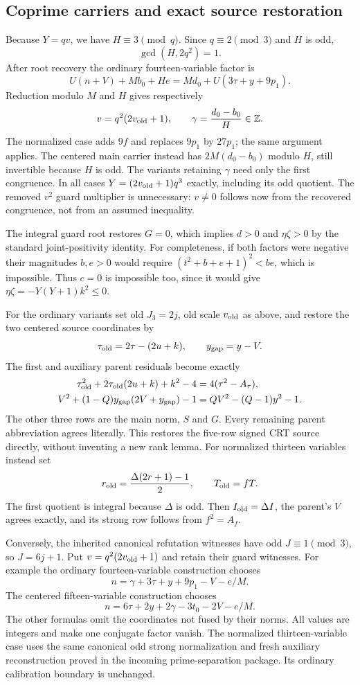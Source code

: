 \documentclass[11pt]{article}
\begin{document}
\subsection{Coprime carriers and exact source restoration}
Because $Y=qv$, we have $H\equiv3\pmod q$. Since $q\equiv2\pmod3$
and $H$ is odd,
\[
 \gcd(H,2q^2)=1.
\]
After root recovery the ordinary fourteen-variable factor is
\[
 U(n+V)+Mb_0+He=Md_0+U(3\tau+y+9p_1).
\]
Reduction modulo $M$ and $H$ gives respectively
\[
 v=q^2(2v_{\rm old}+1),\qquad
 \gamma=\frac{d_0-b_0}{H}\in\mathbb Z.
\]
The normalized case adds $9f$ and replaces $9p_1$ by $27p_1$;
the same argument applies. The centered main carrier instead has
$2M(d_0-b_0)$ modulo $H$, still invertible because $H$ is odd.
The variants retaining $\gamma$ need only the first congruence.
In all cases $Y=(2v_{\rm old}+1)q^3$ exactly, including its odd quotient.
The removed $v^2$ guard multiplier is unnecessary: $v\ne0$ follows
now from the recovered congruence, not from an assumed inequality.

The integral guard root restores $G=0$, which implies $d>0$ and
$\eta\zeta>0$ by the standard joint-positivity identity. For completeness,
if both factors were negative their magnitudes $b,e>0$ would require
$(t^2+b+e+1)^2<be$, which is impossible. Thus $c=0$ is impossible too,
since it would give $\eta\zeta=-Y(Y+1)k^2\le0$.

For the ordinary variants set old $J_3=2j$, old scale $v_{\rm old}$
as above, and restore the two centered source coordinates by
\[
 \tau_{\rm old}=2\tau-(2u+k),\qquad y_{\rm gap}=y-V.
\]
The first and auxiliary parent residuals become exactly
\begin{align*}
 \tau_{\rm old}^2+2\tau_{\rm old}(2u+k)+k^2-4
   &=4(\tau^2-A_\tau),\\
 V^2+(1-Q)y_{\rm gap}(2V+y_{\rm gap})-1
   &=QV^2-(Q-1)y^2-1.
\end{align*}
The other three rows are the main norm, $S$ and $G$.
Every remaining parent abbreviation agrees literally. This restores the
five-row signed CRT source directly, without inventing a new rank lemma.
For normalized thirteen variables instead set
\[
 r_{\rm old}=\frac{\Delta(2r+1)-1}{2},\qquad
 T_{\rm old}=fT.
\]
The first quotient is integral because $\Delta$ is odd. Then
$I_{\rm old}=\Delta I$, the parent's $V$ agrees exactly, and its strong
row follows from $f^2=A_f$.

Conversely, the inherited canonical refutation witnesses have odd
$J\equiv1\pmod3$, so $J=6j+1$. Put
$v=q^2(2v_{\rm old}+1)$ and retain their guard witnesses.
For example the ordinary fourteen-variable construction chooses
\[
 n=\gamma+3\tau+y+9p_1-V-e/M.
\]
The centered fifteen-variable construction chooses
\[
 n=6\tau+2y+2\gamma-3t_0-2V-e/M.
\]
The other formulas omit the coordinates not fused by their norms.
All values are integers and make one conjugate factor vanish.
The normalized thirteen-variable case uses the same canonical odd strong
normalization and fresh auxiliary reconstruction proved in the incoming
prime-separation package. Its ordinary calibration boundary is unchanged.
\end{document}
